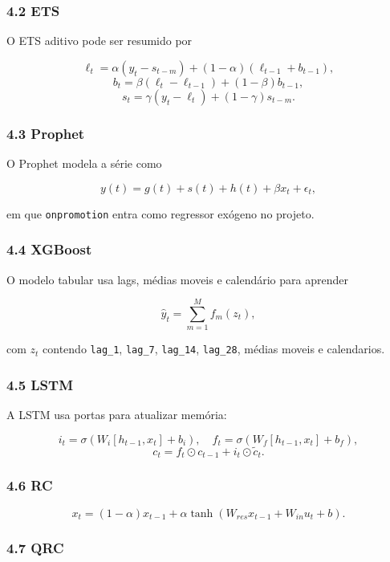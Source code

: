 \documentclass[12pt]{article}
\begin{document}
\subsubsection{4.2 ETS}\label{42-ets}

O ETS aditivo pode ser resumido por

\[
\ell_t = \alpha (y_t - s_{t-m}) + (1 - \alpha)(\ell_{t-1} + b_{t-1}),
\]
\[
b_t = \beta (\ell_t - \ell_{t-1}) + (1 - \beta) b_{t-1},
\]
\[
s_t = \gamma (y_t - \ell_t) + (1 - \gamma) s_{t-m}.
\]

\subsubsection{4.3 Prophet}\label{43-prophet}

O Prophet modela a série como

\[
y(t) = g(t) + s(t) + h(t) + \beta x_t + \epsilon_t,
\]

em que \texttt{onpromotion} entra como regressor exógeno no projeto.

\subsubsection{4.4 XGBoost}\label{44-xgboost}

O modelo tabular usa lags, médias moveis e calendário para aprender

\[
\hat{y}_t = \sum_{m=1}^M f_m(z_t),
\]

com \(z_t\) contendo \texttt{lag\_1}, \texttt{lag\_7}, \texttt{lag\_14}, \texttt{lag\_28}, médias moveis e calendarios.

\subsubsection{4.5 LSTM}\label{45-lstm}

A LSTM usa portas para atualizar memória:

\[
i_t = \sigma(W_i [h_{t-1}, x_t] + b_i), \quad
f_t = \sigma(W_f [h_{t-1}, x_t] + b_f),
\]
\[
c_t = f_t \odot c_{t-1} + i_t \odot \tilde{c}_t.
\]

\subsubsection{4.6 RC}\label{46-rc}

\[
x_t = (1 - \alpha) x_{t-1} + \alpha \tanh(W_{res} x_{t-1} + W_{in} u_t + b).
\]

\subsubsection{4.7 QRC}\label{47-qrc}
\end{document}

